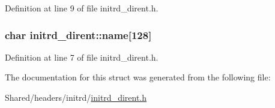 Definition at line 9 of file initrd\_\-dirent.h.

\hypertarget{structinitrd__dirent_ae20cd12c5ee50add1bb05e9c4d384d91}{
\subsubsection[{name}]{\setlength{\rightskip}{0pt plus 5cm}char {\bf initrd\_\-dirent::name}\mbox{[}128\mbox{]}}}
\label{structinitrd__dirent_ae20cd12c5ee50add1bb05e9c4d384d91}


Definition at line 7 of file initrd\_\-dirent.h.



The documentation for this struct was generated from the following file:\begin{DoxyCompactItemize}
\item 
Shared/headers/initrd/\hyperlink{initrd__dirent_8h}{initrd\_\-dirent.h}\end{DoxyCompactItemize}
